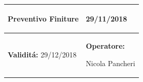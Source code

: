 \documentclass[a4paper]{article}
\begin{document}
                          \begin{center}
                          \begin{tabular}{|L{89mm} R{60mm}| }
                          \hline
                          \vspace{2.5mm}
                          \begin{spacing}{0}
                            \textbf{Preventivo Finiture}
                          \end{spacing}&
                          \vspace{2.5mm}
                          \begin{spacing}{0}

                     29/11/2018

                          \end{spacing}\\
                          \hline
                          \vspace{2.5mm}
                          \begin{spacing}{0}
                            \textbf{Validit\'a:}
                       29/12/2018
                          \end{spacing} &
                          \vspace{2.5mm}
                          \begin{spacing}{0}
                            \textbf{Operatore:}

                       Nicola Pancheri
                          \end{spacing} \\
                          \hline
                          \end{tabular}
                          \end{center}
\end{document}
